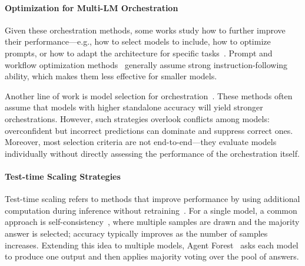 \paragraph{Optimization for Multi-LM Orchestration} Given these orchestration methods, some works study how to further improve their performance—e.g., how to select models to include, how to optimize prompts, or how to adapt the architecture for specific tasks~\citep{chen2023frugalgptuselargelanguage,ong2025routellmlearningroutellms,chen2024routerdcquerybasedrouterdual}. Prompt and workflow optimization methods~\citep{khattab2023dspycompilingdeclarativelanguage,opsahlong2024optimizinginstructionsdemonstrationsmultistage,saadfalcon2025archonarchitecturesearchframework, zhang2025aflowautomatingagenticworkflow} generally assume strong instruction-following ability, which makes them less effective for smaller models.

Another line of work is model selection for orchestration~\citep{chen2025optimizingmodelselectioncompound,poon2025online}. These methods often assume that models with higher standalone accuracy will yield stronger orchestrations. However, such strategies overlook conflicts among models: overconfident but incorrect predictions can dominate and suppress correct ones. Moreover, most selection criteria are not end-to-end—they evaluate models individually without directly assessing the performance of the orchestration itself. 

\paragraph{Test-time Scaling Strategies}
Test-time scaling refers to methods that improve performance by using additional computation during inference without retraining~\citep{snell2024scalingllmtesttimecompute,muennighoff2025s1simpletesttimescaling,zhang2025surveytesttimescalinglarge}. For a single model, a common approach is self-consistency~\citep{Trad_2025,thirukovalluru2024atomicselfconsistencybetterlong,chow2024inferenceawarefinetuningbestofnsampling}, where multiple samples are drawn and the majority answer is selected; accuracy typically improves as the number of samples increases. Extending this idea to multiple models, Agent Forest~\citep{li2024agentsneed} asks each model to produce one output and then applies majority voting over the pool of answers.